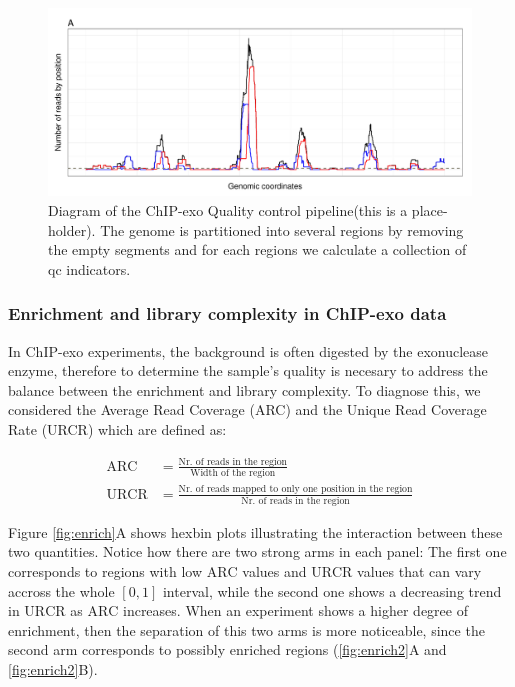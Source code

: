 \documentclass{bmcart}\usepackage[]{graphicx}\usepackage[]{color}
\begin{document}
\begin{figure}[h!]
  \centering
  \includegraphics[width = .9\textwidth]{../figs/for_paper/coverage_diagram.pdf}
  \caption{Diagram of the ChIP-exo Quality control pipeline(this is a
    place-holder). The genome is partitioned into several regions by
    removing the empty segments and for each regions we calculate a
    collection of qc indicators.}
  \label{fig:qcdiagram}
\end{figure}

\subsubsection{Enrichment and library complexity in ChIP-exo data}
\label{sec:enri}


In ChIP-exo experiments, the background is often digested by the
exonuclease enzyme, therefore to determine the sample's quality is
necesary to address the balance between the enrichment and library
complexity. To diagnose this, we considered the Average Read Coverage
(ARC) and the Unique Read Coverage Rate (URCR) which are defined as:

\begin{align}
  \mbox{ARC} &= \frac{\text{Nr. of reads in the region}}{\text{Width of the region}} \nonumber \\
  \mbox{URCR} &= \frac{\text{Nr. of reads mapped to only one position
      in the region}}{\text{Nr. of reads in the region}} \nonumber
\end{align}

Figure \ref{fig:enrich}A shows hexbin plots illustrating the
interaction between these two quantities. Notice how there are two
strong arms in each panel: The first one corresponds to regions with
low $\mbox{ARC}$ values and $\mbox{URCR}$ values that can vary accross
the whole $[0,1]$ interval, while the second one shows a decreasing
trend in $\mbox{URCR}$ as $\mbox{ARC}$ increases. When an experiment
shows a higher degree of enrichment, then the separation of this two
arms is more noticeable, since the second arm corresponds to possibly
enriched regions (\ref{fig:enrich2}A and \ref{fig:enrich2}B).
\end{document}
